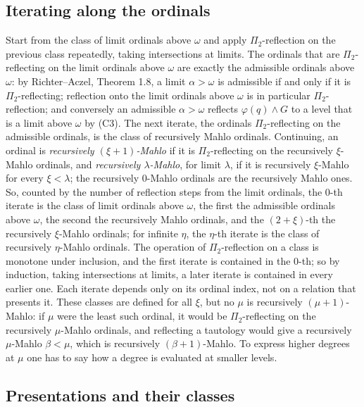 \documentclass[11pt]{article}
\begin{document}
\subsection{Iterating along the ordinals}

Start from the class of limit ordinals above $\omega$ and apply $\Pi_2$-reflection on the previous class
repeatedly, taking intersections at limits. The ordinals that are $\Pi_2$-reflecting on the limit ordinals
above $\omega$ are exactly the admissible ordinals above $\omega$: by Richter--Aczel, Theorem 1.8, a limit
$\alpha > \omega$ is admissible if and only if it is $\Pi_2$-reflecting; reflection onto the limit ordinals above
$\omega$ is in particular $\Pi_2$-reflection; and conversely an admissible $\alpha > \omega$ reflects
$\varphi(q) \wedge G$ to a level that is a limit above $\omega$ by (C3). The next iterate, the ordinals
$\Pi_2$-reflecting on the admissible ordinals, is the class of recursively Mahlo ordinals. Continuing, an ordinal is
\emph{recursively $(\xi+1)$-Mahlo} if it is $\Pi_2$-reflecting on the recursively $\xi$-Mahlo ordinals, and
\emph{recursively $\lambda$-Mahlo}, for limit $\lambda$, if it is recursively $\xi$-Mahlo for every $\xi < \lambda$;
the recursively $0$-Mahlo ordinals are the recursively Mahlo ones. So, counted by the number of reflection steps
from the limit ordinals, the $0$-th iterate is the class of limit ordinals above $\omega$, the first the admissible
ordinals above $\omega$, the second the recursively Mahlo ordinals, and the $(2+\xi)$-th the recursively
$\xi$-Mahlo ordinals; for infinite $\eta$, the $\eta$-th iterate is the class of recursively $\eta$-Mahlo ordinals.
The operation of $\Pi_2$-reflection on a class is monotone under inclusion, and the first iterate is contained in
the $0$-th; so by induction, taking intersections at limits, a later iterate is contained in every earlier one. Each
iterate depends only on its ordinal index, not on a relation that presents it.
These classes are defined for all $\xi$, but no $\mu$ is recursively $(\mu+1)$-Mahlo: if $\mu$ were the least such
ordinal, it would be $\Pi_2$-reflecting on the recursively $\mu$-Mahlo ordinals, and reflecting a tautology would
give a recursively $\mu$-Mahlo $\beta < \mu$, which is recursively $(\beta+1)$-Mahlo. To express higher degrees
at $\mu$ one has to say how a degree is evaluated at smaller levels.

\subsection{Presentations and their classes}
\end{document}
